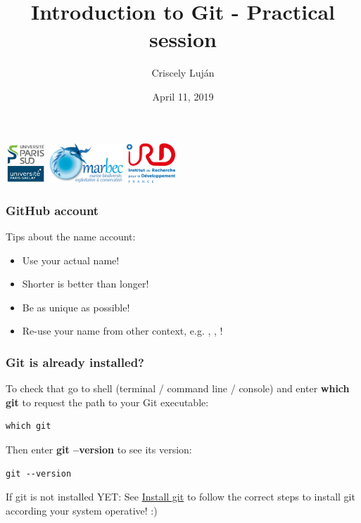 \documentclass{beamer}
\title[Version control, Git and GitHub]{Introduction to Git - Practical session}
\author{Criscely Luj\'{a}n}
\institute[Universit\'{e} Paris-Sud, UMR MARBEC]  
{Universit\'{e} Paris-Sud, UMR MARBEC \\ 
\medskip
\textit{criscely.lujan@ird.fr}}
\date{April 11, 2019}
\begin{document}
\begin{frame}
\titlepage 
\begin{center}
\includegraphics[height=1.5cm]{img/logo_psud.jpg}
\hspace{1em}
\includegraphics[height=1.5cm]{img/logo_marbec.png}
\hspace{1em}
\includegraphics[height=1.5cm]{img/logo_ird.png}
\end{center}
\end{frame}


\begin{frame}
\frametitle{GitHub account}

Tips about the name account:

\begin{itemize}
    \item Use your actual name!
    \item Shorter is better than longer!
    \item Be as unique as possible!
    \item Re-use your name from other context, e.g. \faTwitter, \faSlack, !
\end{itemize}
\end{frame}


\begin{frame}[fragile]
\frametitle{Git is already installed?}

To check that go to shell (terminal / command line / console) and enter \textbf{which git} to request the path to your Git executable:
\vspace{1em}

\begin{lstlisting}
which git
\end{lstlisting}

\vspace{1em}

Then enter \textbf{git --version} to see its version:

\begin{lstlisting}
git --version
\end{lstlisting}

\vspace{1em}

If git is not installed YET: See \href{https://happygitwithr.com/install-git.html}{\faStar Install git} to follow the correct steps to install git according your system operative! :)
\end{frame}
\end{document}
